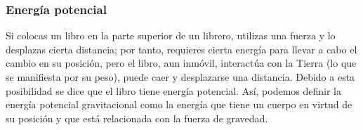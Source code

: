 \documentclass[11pt]{book}
\newenvironment{questions}[1][]{\enumerate[,#1]}{\endenumerate}
\begin{document}

\subsubsection{Energ\'ia potencial}
Si colocas un libro en la parte superior de un librero, utilizas una fuerza y
lo desplazas cierta distancia; por tanto, requieres cierta energ\'ia para llevar
a cabo el cambio en su posici\'on, pero el libro, aun inm\'ovil, interact\'ua con la
Tierra (lo que se
manifiesta por su peso), puede caer y desplazarse una distancia. Debido a esta
posibilidad se dice que el libro tiene energ\'ia potencial. As\'i, podemos definir
la energ\'ia
potencial gravitacional como la energ\'ia que tiene un cuerpo en virtud de su
posici\'on
y que est\'a relacionada con la fuerza de gravedad.
\end{document}
